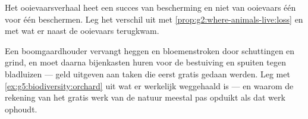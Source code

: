 \begin{exercise}[$\star\star$]\label{exo:g5:biodiversity:10}
Het ooievaarsverhaal heet een succes van \emph{}bescherming
en niet van ooievaars één voor één beschermen. Leg het verschil uit met
\cref{prop:g2:where-animals-live:loss} en met wat er naast de ooievaars
terugkwam.
\end{exercise}

\begin{exercise}[$\star\star\star$]\label{exo:g5:biodiversity:11}
Een boomgaardhouder vervangt heggen en bloemenstroken door schuttingen
en grind, en moet daarna bijenkasten huren voor de bestuiving en spuiten
tegen bladluizen --- geld uitgeven aan taken die eerst gratis gedaan
werden. Leg met \cref{ex:g5:biodiversity:orchard} uit wat er werkelijk
weggehaald is --- en waarom de rekening van het gratis werk van de natuur
meestal pas opduikt als dat werk ophoudt.
\end{exercise}
